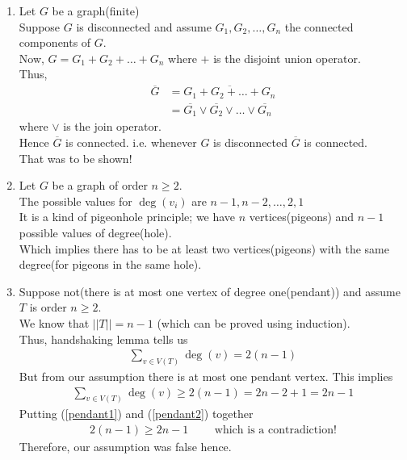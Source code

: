 \documentclass[paper=a4, fontsize=12pt]{scrartcl} %
\theoremstyle{definition}
\theoremstyle{remark}
\begin{document}
\begin{enumerate}
  \item Let $G$ be a graph(finite)\\
  Suppose $G$ is disconnected and assume $G_1,G_2,\ldots,G_n$ the connected components of $G$.\\
  Now, $G = G_1+G_2+\ldots+G_n$ where $+$ is the disjoint union operator.\\
  Thus,
  \begin{align*}
   \overline{G} &=\overline{G_1+G_2+\ldots+G_n}\\
              &=\overline{G_1}\vee\overline{G_2}\vee \ldots \vee\overline{G_n}
  \end{align*}
  where $\vee$ is the join operator.\\
  Hence $\overline{G}$ is connected. i.e. whenever $G$ is disconnected $\overline{G}$ is connected.\\
  That was to be shown!

  \item Let $G$ be a graph of order $n\geq2$.\\
  The possible values for $\deg(v_i)$ are $n-1,n-2,\ldots,2,1$\\
  It is a kind of pigeonhole principle; we have $n$ vertices(pigeons) and $n-1$ possible values of degree(hole).\\
  Which implies there has to be at least two vertices(pigeons) with the same degree(for pigeons in the same hole).
  \item Suppose not(there is at most one vertex of degree one(pendant)) and assume $T$ is order $n\geq2$.\\
  We know that $||T||=n-1$ (which can be proved using induction).\\
  Thus, handshaking lemma tells us
  \begin{align}\label{pendant1}
  \sum_{v\in V(T)}\deg(v)=2(n-1)
  \end{align}
  But from our assumption there is at most one pendant vertex. This implies
  \begin{align}\label{pendant2}
  \sum_{v\in V(T)}\deg(v)\geq 2(n-1)=2n-2+1=2n-1
  \end{align}
  Putting (\ref{pendant1}) and (\ref{pendant2}) together
  \begin{align*}
  2(n-1)\geq 2n-1 \qquad \text{ which is a contradiction!}
  \end{align*}
  Therefore, our assumption was false hence.
\end{enumerate}
\end{document}
